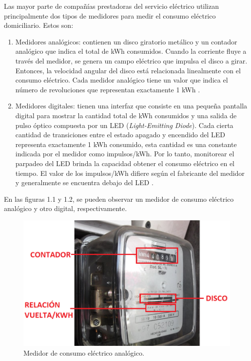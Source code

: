 Las mayor parte de compañías prestadoras del servicio eléctrico utilizan principalmente dos tipos de medidores para medir el consumo eléctrico domiciliario. Estos son:

\begin{enumerate}
	\item Medidores analógicos: contienen un disco giratorio metálico y un contador analógico que indica el total de kWh consumidos. Cuando la corriente fluye a través del medidor, se genera un campo eléctrico que impulsa el disco a girar. Entonces, la velocidad angular del disco está relacionada linealmente con el consumo eléctrico. Cada medidor analógico tiene un valor que indica el número de revoluciones que representan exactamente 1 kWh \citep{WEBSITE:2}.
	\item Medidores digitales: tienen una interfaz que consiste en una pequeña pantalla digital para mostrar la cantidad total de kWh consumidos y una salida de pulso óptico compuesta por un LED (\textit{Light-Emitting Diode}). Cada cierta cantidad de transiciones entre el estado apagado y encendido del LED representa exactamente 1 kWh consumido, esta cantidad es una constante indicada por el medidor como impulsos/kWh. Por lo tanto, monitorear el parpadeo del LED brinda la capacidad obtener el consumo eléctrico en el tiempo. El valor de los impulsos/kWh difiere según el fabricante del medidor y generalmente se encuentra debajo del LED \citep{WEBSITE:2}.
\end{enumerate}

En las figuras 1.1 y 1.2, se pueden observar un medidor de consumo eléctrico analógico y otro digital, respectivamente.

\begin{figure}[h]
	\centering
	\includegraphics[scale=0.43]{./Figures/analog_meter.png}
	\caption{ Medidor de consumo eléctrico analógico\protect\footnotemark.}
	\label{fig:analogMeter}
\end{figure}

